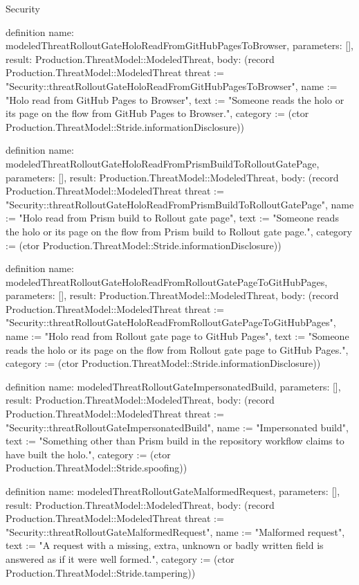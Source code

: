 \begin{lexlean}{Security}
\begin{semanticmodule}
definition{
  name: modeledThreatRolloutGateHoloReadFromGitHubPagesToBrowser,
  parameters: [],
  result: Production.ThreatModel::ModeledThreat,
  body: (record Production.ThreatModel::ModeledThreat {threat := "Security::threatRolloutGateHoloReadFromGitHubPagesToBrowser", name := "Holo read from GitHub Pages to Browser", text := "Someone reads the holo or its page on the flow from GitHub Pages to Browser.", category := (ctor Production.ThreatModel::Stride.informationDisclosure)})
}

definition{
  name: modeledThreatRolloutGateHoloReadFromPrismBuildToRolloutGatePage,
  parameters: [],
  result: Production.ThreatModel::ModeledThreat,
  body: (record Production.ThreatModel::ModeledThreat {threat := "Security::threatRolloutGateHoloReadFromPrismBuildToRolloutGatePage", name := "Holo read from Prism build to Rollout gate page", text := "Someone reads the holo or its page on the flow from Prism build to Rollout gate page.", category := (ctor Production.ThreatModel::Stride.informationDisclosure)})
}

definition{
  name: modeledThreatRolloutGateHoloReadFromRolloutGatePageToGitHubPages,
  parameters: [],
  result: Production.ThreatModel::ModeledThreat,
  body: (record Production.ThreatModel::ModeledThreat {threat := "Security::threatRolloutGateHoloReadFromRolloutGatePageToGitHubPages", name := "Holo read from Rollout gate page to GitHub Pages", text := "Someone reads the holo or its page on the flow from Rollout gate page to GitHub Pages.", category := (ctor Production.ThreatModel::Stride.informationDisclosure)})
}

definition{
  name: modeledThreatRolloutGateImpersonatedBuild,
  parameters: [],
  result: Production.ThreatModel::ModeledThreat,
  body: (record Production.ThreatModel::ModeledThreat {threat := "Security::threatRolloutGateImpersonatedBuild", name := "Impersonated build", text := "Something other than Prism build in the repository workflow claims to have built the holo.", category := (ctor Production.ThreatModel::Stride.spoofing)})
}

definition{
  name: modeledThreatRolloutGateMalformedRequest,
  parameters: [],
  result: Production.ThreatModel::ModeledThreat,
  body: (record Production.ThreatModel::ModeledThreat {threat := "Security::threatRolloutGateMalformedRequest", name := "Malformed request", text := "A request with a missing, extra, unknown or badly written field is answered as if it were well formed.", category := (ctor Production.ThreatModel::Stride.tampering)})
}


\end{semanticmodule}
\end{lexlean}
